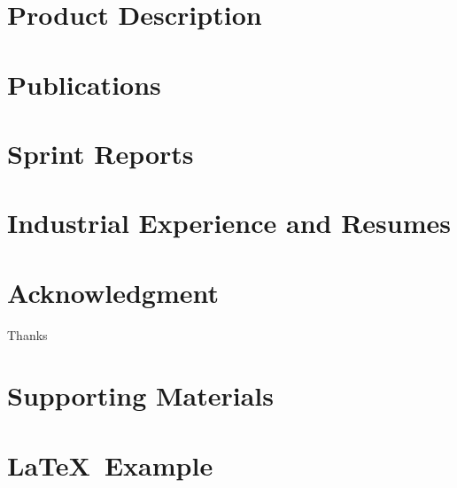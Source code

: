 \documentclass{book}
\begin{document}
\appendix

\chapter{Product Description}


\chapter{Publications}   %


\chapter{Sprint Reports}


\chapter{Industrial Experience and Resumes}


\chapter{Acknowledgment}
\label{SpecialThanks}  
Thanks  

\chapter{Supporting Materials}


\backmatter

%

\chapter{\LaTeX\ Example}

\end{document}
